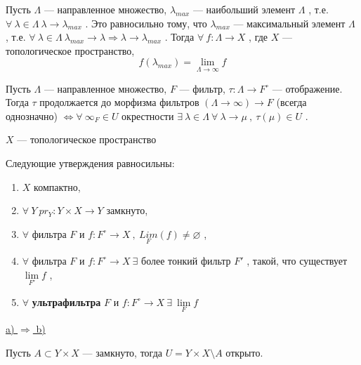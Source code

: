 \SSsect Пусть \( \Lambda \) --- направленное множество, \( \lambda_{max} \) --- наибольший элемент \( \Lambda \) , т.е. \( \forall~\lambda \in \Lambda~ \lambda \rightarrow \lambda_{max} \) . Это равносильно тому, что \( \lambda_{max} \) --- максимальный элемент \( \Lambda \) , т.е. \( \forall~\lambda \in \Lambda~ \lambda_{max} \rightarrow \lambda \Rightarrow \lambda \rightarrow \lambda_{max} \) .
Тогда \( \forall~ f:\Lambda \rightarrow X \) , где \( X \) --- топологическое пространство,
\[ f(\lambda_{max}) = \lim\limits_{\Lambda \rightarrow \infty} f \]

\SSsect Пусть \( \Lambda \) --- направленное множество, \( F \) --- фильтр, \( \tau:\Lambda \rightarrow F^{\circ} \) --- отображение. Тогда \( \tau \) продолжается до морфизма фильтров \( (\Lambda \rightarrow \infty) \rightarrow F \) (всегда однозначно) \( \Leftrightarrow \forall~ \infty_F \in U \) окрестности \( \exists~\lambda \in \Lambda ~\forall~\lambda \rightarrow \mu ~,~ \tau(\mu) \in U \) .

\pagebreak

\SSbullet 
\begin{center}
    \( X \) --- топологическое пространство
\end{center}

\SSsect[!] Следующие утверждения равносильны:
\begin{enumerate}[label={\alph*)}]
\item \( X \) компактно,
\item \( \forall~ Y ~ pr_Y: Y \times X \rightarrow Y \) замкнуто,
\item \( \forall \) фильтра \( F \) и \( f:F^{\circ} \rightarrow X ~,~ \underset{F}{Lim}(f) \neq \varnothing \) ,
\item \( \forall \) фильтра \( F \) и \( f:F^{\circ} \rightarrow X ~\exists \) более тонкий фильтр \( F' \) , такой, что существует \( \lim\limits_{F'} f \) ,
\item \( \forall \) \textbf{ультрафильтра} \( F \) и \( f:F^{\circ} \rightarrow X ~\exists~ \lim\limits_{F} f \)
\end{enumerate}

\SSproof

\underline{a) \( \Rightarrow \) b)}
\vspace

Пусть \( A \subset Y \times X \) --- замкнуто, тогда \( U = Y \times X \setminus A \) открыто.


